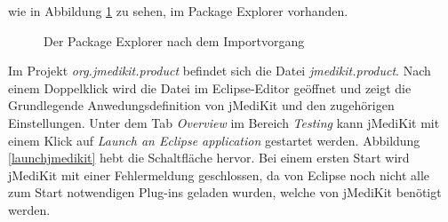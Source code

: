wie in Abbildung \ref{finishedimport} zu sehen, im Package Explorer vorhanden.

\begin{figure}[H]
  \vspace{0.5cm}
  \centering
  \caption{Der Package Explorer nach dem Importvorgang}
  \label{finishedimport}
  \vspace{0.5cm}
\end{figure}

Im Projekt \textit{org.jmedikit.product} befindet sich die Datei \textit{jmedikit.product}. Nach einem Doppelklick wird die Datei im Eclipse-Editor geöffnet und zeigt die Grundlegende Anwedungsdefinition von jMediKit und den zugehörigen Einstellungen. Unter dem Tab \textit{Overview} im Bereich \textit{Testing} kann jMediKit mit einem Klick auf \textit{Launch an Eclipse application} gestartet werden. Abbildung \ref{launchjmedikit} hebt die Schaltfläche hervor. Bei einem ersten Start wird jMediKit mit einer Fehlermeldung geschlossen, da von Eclipse noch nicht alle zum Start notwendigen Plug-ins geladen wurden, welche von jMediKit benötigt werden.

